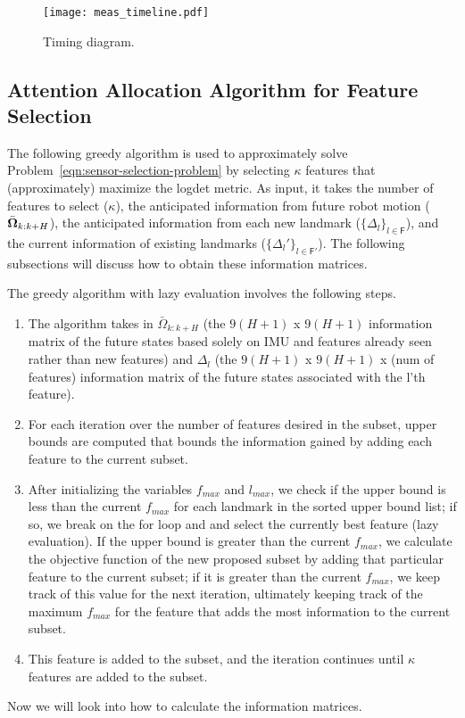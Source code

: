 \begin{figure}
\centering
\texttt{[image: meas\_timeline.pdf]} 
\caption{Timing diagram.}
\label{fig:meas_timeline} 
\end{figure}


\subsection{Attention Allocation Algorithm for Feature Selection}\label{sub:attn_algo}

The following greedy algorithm is used to approximately solve Problem~\eqref{eqn:sensor-selection-problem} by selecting $\kappa$ features that (approximately) maximize the logdet metric.
As input, it takes the number of features to select ($\kappa$), the anticipated information from future robot motion ($\bar{\boldsymbol \Omega}_{k:k+H}$), the anticipated information from each new landmark ($\{\Delta_l\}_{l\in\mathsf{F}}$), and the current information of existing landmarks ($\{\Delta_l'\}_{l\in\mathsf{F}'}$).
The following subsections will discuss how to obtain these information matrices.

The greedy algorithm with lazy evaluation involves the following steps. 
\begin{enumerate}
    \item The algorithm takes in $\bar{\Omega}_{k:k+H}$ (the $9(H+1)$ x $9(H+1)$ information matrix of the future states based solely on IMU and features already seen rather than new features) and $\Delta_l$ (the $9(H+1)$ x $9(H+1)$ x (num of features) information matrix of the future states associated with the l'th feature).
    \item For each iteration over the number of features desired in the subset, upper bounds are computed that bounds the information gained by adding each feature to the current subset.
    \item After initializing the variables $f_{max}$ and $l_{max}$, we check if the upper bound is less than the current $f_{max}$ for each landmark in the sorted upper bound list; if so, we break on the for loop and and select the currently best feature (lazy evaluation). If the upper bound is greater than the current $f_{max}$, we calculate the objective function of the new proposed subset by adding that particular feature to the current subset; if it is greater than the current $f_{max}$, we keep track of this value for the next iteration, ultimately keeping track of the maximum $f_{max}$ for the feature that adds the most information to the current subset.
    \item This feature is added to the subset, and the iteration continues until $\kappa$ features are added to the subset.
\end{enumerate}
Now we will look into how to calculate the information matrices.


